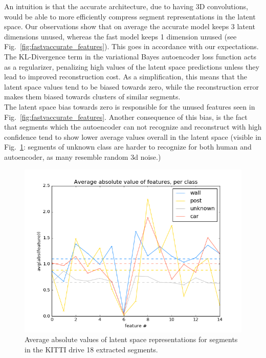 An intuition is that the accurate architecture, due to having 3D convolutions, would be able to more efficiently compress segment representations in the latent space. Our observations show that on average the accurate model keeps 3 latent dimensions unused, whereas the fast model keeps 1 dimension unused (see Fig.~\ref{fig:fastvaccurate_features}). This goes in accordance with our expectations.\\

The KL-Divergence term in the variational Bayes autoencoder loss function acts as a regularizer, penalizing high values of the latent space predictions unless they lead to improved reconstruction cost. As a simplification, this means that the latent space values tend to be biased towards zero, while the reconstruction error makes them biased towards clusters of similar segments.\\

The latent space bias towards zero is responsible for the unused features seen in Fig.~\ref{fig:fastvaccurate_features}. Another consequence of this bias, is the fact that segments which the autoencoder can not recognize and reconstruct with high confidence tend to show lower average values overall in the latent space (visible in Fig.~\ref{fig:avg_abs_features}: segments of unknown class are harder to recognize for both human and autoencoder, as many resemble random 3d noise.)

\begin{figure}
  \centering
  \includegraphics[width=5.2in]{images/avg_abs_features.png}
  \caption{Average absolute values of latent space representations for segments in the KITTI drive 18 extracted segments. }
  \label{fig:avg_abs_features}
\end{figure}

